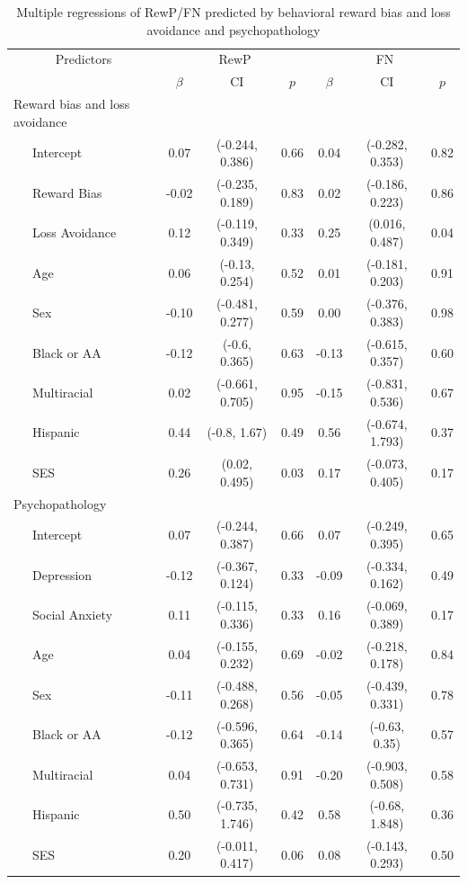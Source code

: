 \documentclass[english,man,floatsintext]{apa6}
\begin{document}
\begin{table}[tbp]

\begin{center}
\begin{threeparttable}

\caption{\label{tab:unnamed-chunk-5}Multiple regressions of RewP/FN predicted by behavioral reward bias and loss avoidance and psychopathology}

\begin{tabular}{lcccccc}
\toprule
 \multicolumn{1}{c}{Predictors} & \multicolumn{3}{c}{RewP} & \multicolumn{3}{c}{FN} \\
\cmidrule(r){1-1} \cmidrule(r){2-4} \cmidrule(r){5-7}
  & $\beta$ & CI & $p$ & $\beta$ & CI & $p$\\
\midrule
Reward bias and loss avoidance &  &  &  &  &  & \\
\ \ \ Intercept & 0.07 & (-0.244, 0.386) & 0.66 & 0.04 & (-0.282, 0.353) & 0.82\\
\ \ \ Reward Bias & -0.02 & (-0.235, 0.189) & 0.83 & 0.02 & (-0.186, 0.223) & 0.86\\
\ \ \ Loss Avoidance & 0.12 & (-0.119, 0.349) & 0.33 & 0.25 & (0.016, 0.487) & 0.04\\
\ \ \ Age & 0.06 & (-0.13, 0.254) & 0.52 & 0.01 & (-0.181, 0.203) & 0.91\\
\ \ \ Sex & -0.10 & (-0.481, 0.277) & 0.59 & 0.00 & (-0.376, 0.383) & 0.98\\
\ \ \ Black or AA & -0.12 & (-0.6, 0.365) & 0.63 & -0.13 & (-0.615, 0.357) & 0.60\\
\ \ \ Multiracial & 0.02 & (-0.661, 0.705) & 0.95 & -0.15 & (-0.831, 0.536) & 0.67\\
\ \ \ Hispanic & 0.44 & (-0.8, 1.67) & 0.49 & 0.56 & (-0.674, 1.793) & 0.37\\
\ \ \ SES & 0.26 & (0.02, 0.495) & 0.03 & 0.17 & (-0.073, 0.405) & 0.17\\
Psychopathology &  &  &  &  &  & \\
\ \ \ Intercept & 0.07 & (-0.244, 0.387) & 0.66 & 0.07 & (-0.249, 0.395) & 0.65\\
\ \ \ Depression & -0.12 & (-0.367, 0.124) & 0.33 & -0.09 & (-0.334, 0.162) & 0.49\\
\ \ \ Social Anxiety & 0.11 & (-0.115, 0.336) & 0.33 & 0.16 & (-0.069, 0.389) & 0.17\\
\ \ \ Age & 0.04 & (-0.155, 0.232) & 0.69 & -0.02 & (-0.218, 0.178) & 0.84\\
\ \ \ Sex & -0.11 & (-0.488, 0.268) & 0.56 & -0.05 & (-0.439, 0.331) & 0.78\\
\ \ \ Black or AA & -0.12 & (-0.596, 0.365) & 0.64 & -0.14 & (-0.63, 0.35) & 0.57\\
\ \ \ Multiracial & 0.04 & (-0.653, 0.731) & 0.91 & -0.20 & (-0.903, 0.508) & 0.58\\
\ \ \ Hispanic & 0.50 & (-0.735, 1.746) & 0.42 & 0.58 & (-0.68, 1.848) & 0.36\\
\ \ \ SES & 0.20 & (-0.011, 0.417) & 0.06 & 0.08 & (-0.143, 0.293) & 0.50\\
\bottomrule
\end{tabular}


\end{threeparttable}
\end{center}
\end{table}
\end{document}
